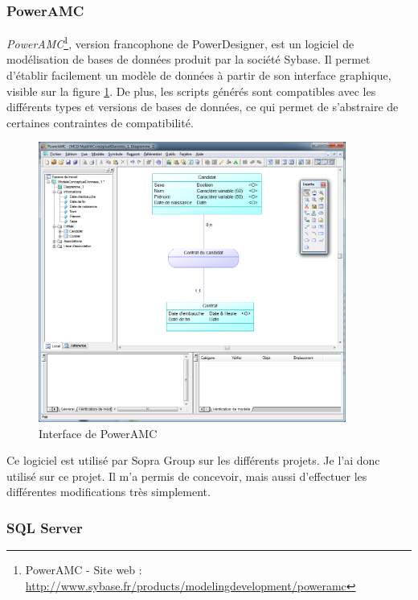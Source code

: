 
\subsubsection{PowerAMC}

\textit{PowerAMC}\footnote{PowerAMC - Site web : \url{http://www.sybase.fr/products/modelingdevelopment/poweramc}}, version francophone de PowerDesigner, est un logiciel de modélisation de bases de données produit par la société Sybase.
Il permet d'établir facilement un modèle de données à partir de son interface graphique, visible sur la figure \ref{PowerAMC}.
De plus, les scripts générés sont compatibles avec les différents types et versions de bases de données, ce qui permet de s'abstraire de certaines contraintes de compatibilité.
\begin{figure}[!h]
	\center
	\includegraphics[width=0.9\textwidth]{img/PowerAMC.png}
	\caption{Interface de PowerAMC}
	\label{PowerAMC}
\end{figure}

Ce logiciel est utilisé par Sopra Group sur les différents projets.
Je l'ai donc utilisé sur ce projet.
Il m'a permis de concevoir, mais aussi d'effectuer les différentes modifications très simplement.


\subsubsection{SQL Server}

